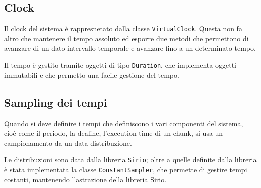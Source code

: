 \subsection{Clock}
Il clock del sistema è rappresnetato dalla classe \texttt{VirtualClock}. Questa non fa altro che mantenere il tempo assoluto ed esporre due metodi che permettono di avanzare di un dato intervallo temporale e avanzare fino a un determinato tempo.

Il tempo è gestito tramite oggetti di tipo \texttt{Duration}, che implementa oggetti immutabili e che permetto una facile gestione del tempo.

\subsection{Sampling dei tempi}
Quando si deve definire i tempi che definiscono i vari componenti del sistema, cioè come il periodo, la dealine, l'execution time di un chunk, si usa un campionamento da un data distribuzione.

Le distribuzioni sono data dalla libreria \texttt{Sirio}; oltre a quelle definite dalla libreria è stata implementata la classe \texttt{ConstantSampler}, che permette di gestire tempi costanti, mantenendo l'astrazione della libreria Sirio.